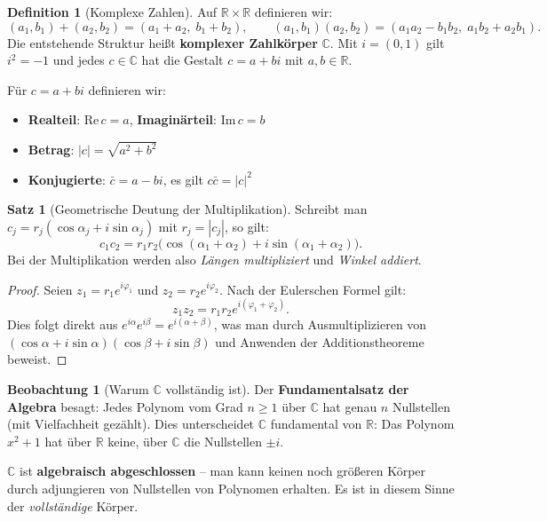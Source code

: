 ﻿\documentclass[a4paper,12pt]{report}
\theoremstyle{definition}
\newtheorem{definition}{Definition}
\newtheorem{satz}{Satz}
\newtheorem{beobachtung}{Beobachtung}
\begin{document}
\begin{definition}[Komplexe Zahlen]
    Auf $\mathbb{R} \times \mathbb{R}$ definieren wir:
    \[
        (a_1, b_1) + (a_2, b_2) = (a_1 + a_2,\; b_1 + b_2), \qquad
        (a_1, b_1)(a_2, b_2) = (a_1 a_2 - b_1 b_2,\; a_1 b_2 + a_2 b_1).
    \]
    Die entstehende Struktur heißt \textbf{komplexer Zahlkörper} $\mathbb{C}$.
    Mit $i = (0, 1)$ gilt $i^2 = -1$ und jedes $c \in \mathbb{C}$ hat die
    Gestalt $c = a + bi$ mit $a, b \in \mathbb{R}$.

    Für $c = a + bi$ definieren wir:
    \begin{itemize}
        \item[-] \textbf{Realteil}: $\mathrm{Re}\, c = a$, \quad \textbf{Imaginärteil}: $\mathrm{Im}\, c = b$
        \item[-] \textbf{Betrag}: $|c| = \sqrt{a^2 + b^2}$
        \item[-] \textbf{Konjugierte}: $\bar{c} = a - bi$, \quad es gilt $c \bar{c} = |c|^2$
    \end{itemize}
\end{definition}

\begin{satz}[Geometrische Deutung der Multiplikation]
    Schreibt man $c_j = r_j(\cos \alpha_j + i \sin \alpha_j)$ mit $r_j = |c_j|$,
    so gilt:
    \[
        c_1 c_2 = r_1 r_2 \bigl(\cos(\alpha_1 + \alpha_2) + i \sin(\alpha_1 + \alpha_2)\bigr).
    \]
    Bei der Multiplikation werden also \emph{Längen multipliziert} und
    \emph{Winkel addiert}.
\end{satz}
\begin{proof}
    Seien $z_1 = r_1 e^{i\varphi_1}$ und $z_2 = r_2 e^{i\varphi_2}$.
    Nach der Eulerschen Formel gilt:
    \[
        z_1 z_2 = r_1 r_2 e^{i(\varphi_1 + \varphi_2)}.
    \]
    Dies folgt direkt aus $e^{i\alpha} e^{i\beta} = e^{i(\alpha+\beta)}$,
    was man durch Ausmultiplizieren von $(\cos\alpha + i\sin\alpha)(\cos\beta + i\sin\beta)$
    und Anwenden der Additionstheoreme beweist.
\end{proof}


\begin{beobachtung}[Warum \texorpdfstring{$\mathbb{C}$}{C} vollständig ist]
    Der \textbf{Fundamentalsatz der Algebra} besagt: Jedes Polynom vom
    Grad $n \ge 1$ über $\mathbb{C}$ hat genau $n$ Nullstellen (mit
    Vielfachheit gezählt). Dies unterscheidet $\mathbb{C}$ fundamental von
    $\mathbb{R}$: Das Polynom $x^2 + 1$ hat über $\mathbb{R}$ keine, über
    $\mathbb{C}$ die Nullstellen $\pm i$.

    $\mathbb{C}$ ist \textbf{algebraisch abgeschlossen} -- man kann keinen
    noch größeren Körper durch adjungieren von Nullstellen von Polynomen
    erhalten. Es ist in diesem Sinne der \emph{vollständige} Körper.
\end{beobachtung}
\end{document}

